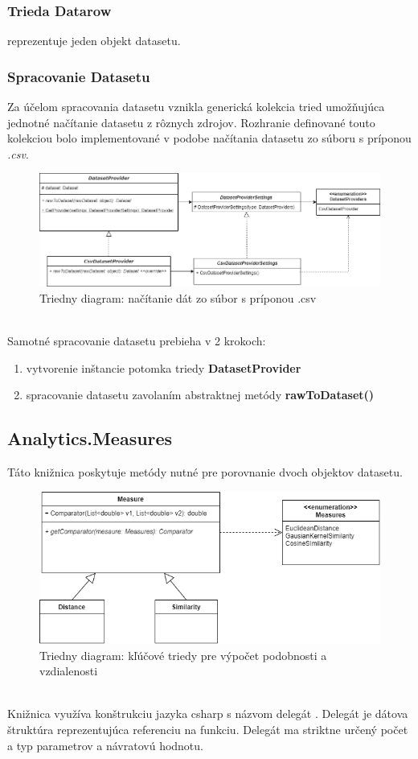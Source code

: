 \documentclass[slovak,master,dept460,male,cpp,cpdeclaration]{diploma}
\begin{document}
\subsubsection{Trieda Datarow} reprezentuje jeden objekt datasetu.
\subsubsection{Spracovanie Datasetu}
Za účelom spracovania datasetu vznikla generická kolekcia tried umožňujúca jednotné načítanie datasetu z rôznych zdrojov. Rozhranie definované touto kolekciou bolo implementované v podobe načítania datasetu zo súboru s príponou \textit{.csv}.
\begin{figure}[H]
\includegraphics[width=\textwidth]{dataset_provider.png}
\caption{Triedny diagram: načítanie dát zo súbor s príponou .csv}
\end{figure} \\
Samotné spracovanie datasetu prebieha v 2 krokoch:
\begin{enumerate}
\item vytvorenie inštancie potomka triedy \textbf{DatasetProvider}
\item spracovanie datasetu zavolaním abstraktnej metódy \textbf{rawToDataset()}
\end{enumerate}

\subsection{Analytics.Measures}
Táto knižnica poskytuje metódy nutné pre porovnanie dvoch objektov datasetu. 
\begin{figure}[H]
\includegraphics[width=\textwidth]{measure.png}
\caption{Triedny diagram: kľúčové triedy pre výpočet podobnosti a vzdialenosti}
\end{figure} \\
Knižnica využíva konštrukciu jazyka csharp s názvom delegát \cite{delegates}. Delegát je dátova štruktúra reprezentujúca referenciu na funkciu. Delegát ma striktne určený počet a typ parametrov a návratovú hodnotu.
\end{document}
